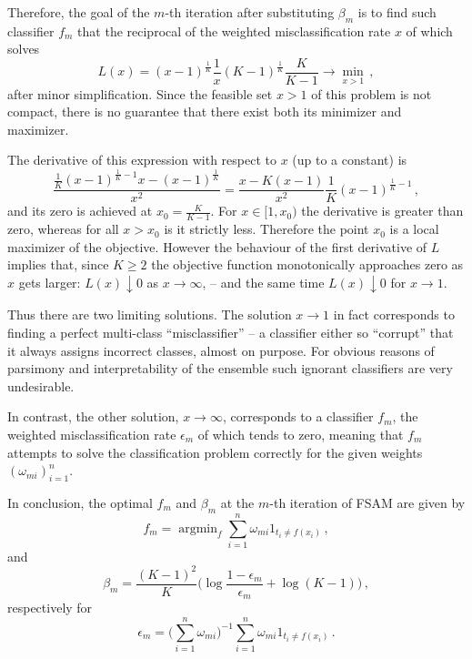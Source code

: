 \documentclass[a4paper]{article}
\newcommand{\argmin}{\mathop{\text{argmin}}}
\begin{document}
Therefore, the goal of the $m$-th iteration after substituting $\beta_m$ is
to find such classifier $f_m$ that the reciprocal of the weighted misclassification
rate $x$ of which solves
\[
L(x)
	= (x-1)^{ \frac{1}{K} } \frac{1}{x} (K-1)^{ \frac{1}{K} } \frac{K}{K-1}
	\to \min_{x > 1}
\,, \]
after minor simplification. Since the feasible set $x > 1$ of this problem is not
compact, there is no guarantee that there exist both its minimizer and maximizer. 

The derivative of this expression with respect to $x$ (up to a constant) is 
\[
\frac{ \frac{1}{K}(x-1)^{ \frac{1}{K}-1 }x - (x-1)^{ \frac{1}{K} } }{x^2}
= \frac{ x - K (x-1) }{x^2}\frac{1}{K} (x-1)^{ \frac{1}{K}-1 }
\,, \]
and its zero is achieved at $x_0 = \frac{K}{K-1}$. For $x\in[1,x_0)$ the derivative
is greater than zero, whereas for all $x>x_0$ is it strictly less. Therefore the
point $x_0$ is a local maximizer of the objective. However the behaviour of the first
derivative of $L$ implies that, since $K\geq 2$ the objective function monotonically
approaches zero as $x$ gets larger: $L(x)\downarrow 0$ as $x\to \infty$, -- and
the same time $L(x) \downarrow 0$ for $x \to 1$.

Thus there are two limiting solutions. The solution $x\to 1$ in fact corresponds to
finding a perfect multi-class ``misclassifier'' -- a classifier either so ``corrupt''
that it always assigns incorrect classes, almost on purpose. For obvious reasons of
parsimony and interpretability of the ensemble such ignorant classifiers are very
undesirable.

In contrast, the other solution, $x\to \infty$, corresponds to a classifier $f_m$,
the weighted misclassification rate $\epsilon_m$ of which tends to zero, meaning
that $f_m$ attempts to solve the classification problem correctly for the given
weights $(\omega_{mi})_{i=1}^n$.

In conclusion, the optimal $f_m$ and $\beta_m$ at the $m$-th iteration of FSAM are
given by
\[ f_m = \argmin_f \sum_{i=1}^n \omega_{mi} 1_{t_i \neq f(x_i)} \,, \]
and
\[
\beta_m
	= \frac{(K-1)^2}{K} \biggl( \log \frac{1-\epsilon_m}{\epsilon_m} + \log (K-1) \biggr)
\,, \]
respectively for
\[
\epsilon_m
	= \biggl( \sum_{i=1}^n \omega_{mi} \biggr)^{-1} \sum_{i=1}^n \omega_{mi} 1_{t_i \neq f(x_i)}
\,. \]
\end{document}
